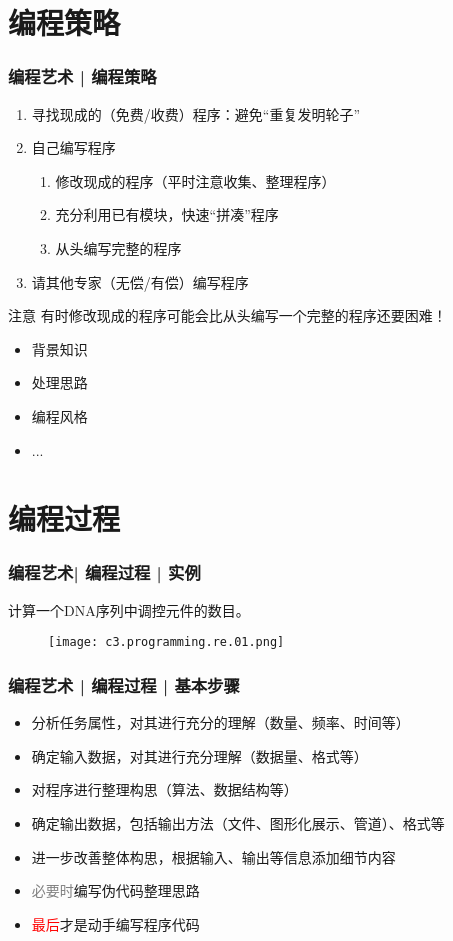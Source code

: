 \section{编程策略}
\begin{frame}
  \frametitle{编程艺术 | \alert{编程策略}}
  \begin{enumerate}
    \item 寻找现成的（免费/收费）程序：避免“重复发明轮子”
    \item 自己编写程序
      \begin{enumerate}
	\item 修改现成的程序（平时注意收集、整理程序）
	\item 充分利用已有模块，快速“拼凑”程序
	\item 从头编写完整的程序
      \end{enumerate}
    \item 请其他专家（无偿/有偿）编写程序
  \end{enumerate}
  \pause
  \begin{block}{注意}
    有时修改现成的程序可能会比从头编写一个完整的程序还要困难！
    \begin{itemize}
      \item 背景知识
      \item 处理思路
      \item 编程风格
      \item ...
    \end{itemize}
  \end{block}
\end{frame}

\section{编程过程}
\begin{frame}
  \frametitle{编程艺术| 编程过程 | 实例}
  \begin{center}
    {\Large 计算一个DNA序列中调控元件的数目。}
  \end{center}
  \begin{figure}
    \centering
    \texttt{[image: c3.programming.re.01.png]}
  \end{figure}
\end{frame}

\begin{frame}
  \frametitle{编程艺术 | 编程过程 | \alert{基本步骤}}
  \begin{itemize}
    \item 分析任务属性，对其进行充分的理解（数量、频率、时间等）
    \item 确定输入数据，对其进行充分理解（数据量、格式等）
    \item 对程序进行整理构思（算法、数据结构等）
    \item 确定输出数据，包括输出方法（文件、图形化展示、管道）、格式等
    \item 进一步改善整体构思，根据输入、输出等信息添加细节内容
    \item \textcolor{gray}{必要时}编写伪代码整理思路
    \item \textcolor{red}{最后}才是动手编写程序代码
  \end{itemize}
\end{frame}

